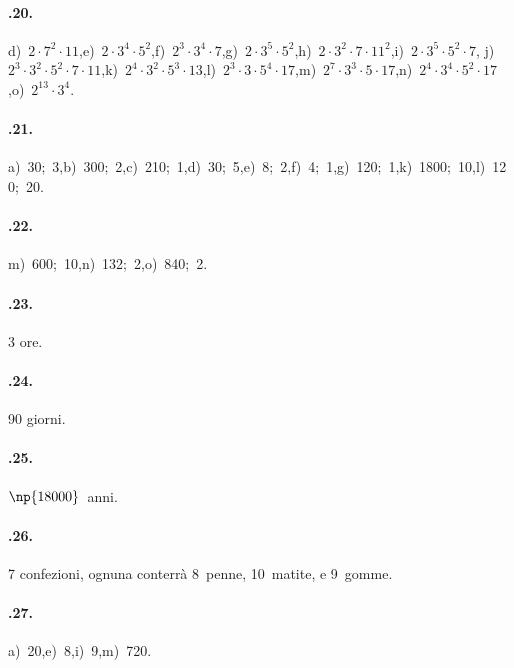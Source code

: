 \paragraph{\thechapter.20.}
d)~$2\cdot7^2\cdot11$,\quad e)~$2\cdot3^4\cdot5^2$,\quad f)~$2^3\cdot3^4\cdot7$,\quad g)~$2\cdot3^5\cdot5^2$,\quad h)~$2\cdot3^2\cdot7\cdot11^2$,\quad i)~$2\cdot3^5\cdot5^2\cdot7$,\quad
j)~$2^3\cdot3^2\cdot5^2\cdot7\cdot11$,\quad k)~$2^4\cdot3^2\cdot5^3\cdot13$,\quad l)~$2^3\cdot3\cdot5^4\cdot17$,\quad m)~$2^7\cdot3^3\cdot5\cdot17$,\quad n)~$2^4\cdot3^4\cdot5^2\cdot17$,\quad o)~$2^{13}\cdot3^4$.

\paragraph{\thechapter.21.}
a)~30;~3,\quad b)~300;~2,\quad c)~210;~1,\quad d)~30;~5,\quad e)~8;~2,\quad f)~4;~1,\quad g)~120;~1,\quad k)~1800;~10,\quad l)~120;~20.

\paragraph{\thechapter.22.}
m)~600;~10,\quad n)~132;~2,\quad o)~840;~2.

\begin{multicols}{3}
\paragraph{\thechapter.23.}
3 ore.

\paragraph{\thechapter.24.}
90 giorni.

\paragraph{\thechapter.25.}
$ \np{18000}$~anni.
\end{multicols}

\paragraph{\thechapter.26.}
7 confezioni, ognuna conterrà 8~penne, 10~matite, e 9~gomme.

\paragraph{\thechapter.27.}
a)~20,\quad e)~8,\quad i)~9,\quad m)~720.

